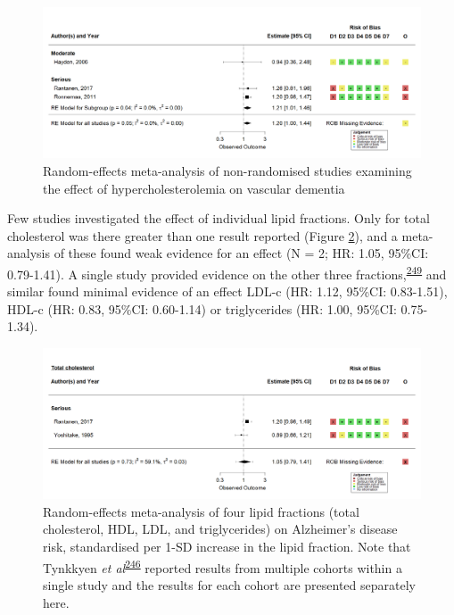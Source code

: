 \documentclass[a4paper, twoside]{templates/ociamthesis}
\begin{document}
\begin{figure}[H]
\includegraphics[width=1\linewidth]{figures/sys-rev/fp_obs_hyperchol_VaD} \caption[Meta-analysis of hypercholesterolemia on vascular dementia]{Random-effects meta-analysis of non-randomised studies examining the effect of hypercholesterolemia on vascular dementia}\label{fig:obsHyperVaD}
\end{figure}

Few studies investigated the effect of individual lipid fractions. Only for total cholesterol was there greater than one result reported (Figure \ref{fig:lipidFractionsVaD}), and a meta-analysis of these found weak evidence for an effect (N = 2; HR: 1.05, 95\%CI: 0.79-1.41). A single study provided evidence on the other three fractions,\textsuperscript{\protect\hyperlink{ref-yoshitake1995}{249}} and similar found minimal evidence of an effect LDL-c (HR: 1.12, 95\%CI: 0.83-1.51), HDL-c (HR: 0.83, 95\%CI: 0.60-1.14) or triglycerides (HR: 1.00, 95\%CI: 0.75-1.34).





\begin{figure}[H]
\includegraphics[width=1\linewidth]{figures/sys-rev/fp_obs_VaD_TC_} \caption[Random-effects meta-analysis of four lipid fractions on Alzheimer's disease]{Random-effects meta-analysis of four lipid fractions (total cholesterol, HDL, LDL, and triglycerides) on Alzheimer's disease risk, standardised per 1-SD increase in the lipid fraction. Note that Tynkkyen \emph{et al}\textsuperscript{\protect\hyperlink{ref-tynkkynen2018}{246}} reported results from multiple cohorts within a single study and the results for each cohort are presented separately here.}\label{fig:lipidFractionsVaD}
\end{figure}
\end{document}
